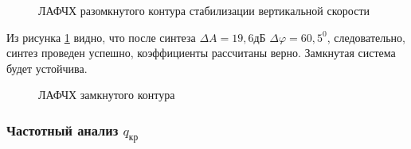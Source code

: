 \begin{figure}[H]
    \caption{ЛАФЧХ разомкнутого контура стабилизации вертикальной скорости}
    \label{fig:Вертикальная скорость раз qMAX}
\end{figure}

Из рисунка \ref{fig:Вертикальная скорость раз qMAX} видно, что после синтеза $\Delta A = 19,6 $дБ $\Delta \varphi = 60,5^0$, следовательно, синтез проведен успешно, коэффициенты рассчитаны верно. Замкнутая система будет устойчива.  

\begin{figure}[H]
    \caption{ЛАФЧХ замкнутого контура }
    \label{fig:Вертикальная скорость зам qMAX}
\end{figure}

\subsubsection{Частотный анализ $q_{\text{кр}}$}

